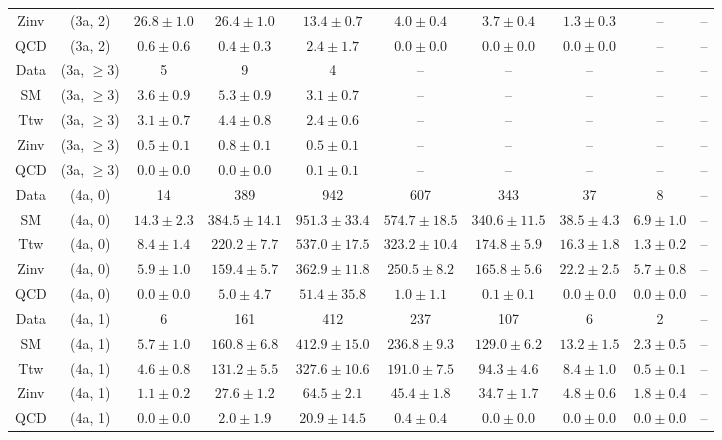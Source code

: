 \begin{table}[h!]
{\begin{tabular}{cccccccccc}
	Zinv & (3a, 2) & $26.8\pm 1.0$ & $26.4\pm 1.0$ & $13.4\pm 0.7$ & $4.0\pm 0.4$ & $3.7\pm 0.4$ & $1.3\pm 0.3$ & -- & -- \\[0.5ex] 
	QCD & (3a, 2) & $0.6\pm 0.6$ & $0.4\pm 0.3$ & $2.4\pm 1.7$ & $0.0\pm 0.0$ & $0.0\pm 0.0$ & $0.0\pm 0.0$ & -- & -- \\[0.5ex] 
	Data & (3a, $\ge3$) & 5 & 9 & 4 & -- & -- & -- & -- & -- \\[0.5ex] 
	SM & (3a, $\ge3$) & $3.6\pm 0.9$ & $5.3\pm 0.9$ & $3.1\pm 0.7$ & -- & -- & -- & -- & -- \\[0.5ex] 
	Ttw & (3a, $\ge3$) & $3.1\pm 0.7$ & $4.4\pm 0.8$ & $2.4\pm 0.6$ & -- & -- & -- & -- & -- \\[0.5ex] 
	Zinv & (3a, $\ge3$) & $0.5\pm 0.1$ & $0.8\pm 0.1$ & $0.5\pm 0.1$ & -- & -- & -- & -- & -- \\[0.5ex] 
	QCD & (3a, $\ge3$) & $0.0\pm 0.0$ & $0.0\pm 0.0$ & $0.1\pm 0.1$ & -- & -- & -- & -- & -- \\[0.5ex] 
	Data & (4a, 0) & 14 & 389 & 942 & 607 & 343 & 37 & 8 & -- \\[0.5ex] 
	SM & (4a, 0) & $14.3\pm 2.3$ & $384.5\pm 14.1$ & $951.3\pm 33.4$ & $574.7\pm 18.5$ & $340.6\pm 11.5$ & $38.5\pm 4.3$ & $6.9\pm 1.0$ & -- \\[0.5ex] 
	Ttw & (4a, 0) & $8.4\pm 1.4$ & $220.2\pm 7.7$ & $537.0\pm 17.5$ & $323.2\pm 10.4$ & $174.8\pm 5.9$ & $16.3\pm 1.8$ & $1.3\pm 0.2$ & -- \\[0.5ex] 
	Zinv & (4a, 0) & $5.9\pm 1.0$ & $159.4\pm 5.7$ & $362.9\pm 11.8$ & $250.5\pm 8.2$ & $165.8\pm 5.6$ & $22.2\pm 2.5$ & $5.7\pm 0.8$ & -- \\[0.5ex] 
	QCD & (4a, 0) & $0.0\pm 0.0$ & $5.0\pm 4.7$ & $51.4\pm 35.8$ & $1.0\pm 1.1$ & $0.1\pm 0.1$ & $0.0\pm 0.0$ & $0.0\pm 0.0$ & -- \\[0.5ex] 
	Data & (4a, 1) & 6 & 161 & 412 & 237 & 107 & 6 & 2 & -- \\[0.5ex] 
	SM & (4a, 1) & $5.7\pm 1.0$ & $160.8\pm 6.8$ & $412.9\pm 15.0$ & $236.8\pm 9.3$ & $129.0\pm 6.2$ & $13.2\pm 1.5$ & $2.3\pm 0.5$ & -- \\[0.5ex] 
	Ttw & (4a, 1) & $4.6\pm 0.8$ & $131.2\pm 5.5$ & $327.6\pm 10.6$ & $191.0\pm 7.5$ & $94.3\pm 4.6$ & $8.4\pm 1.0$ & $0.5\pm 0.1$ & -- \\[0.5ex] 
	Zinv & (4a, 1) & $1.1\pm 0.2$ & $27.6\pm 1.2$ & $64.5\pm 2.1$ & $45.4\pm 1.8$ & $34.7\pm 1.7$ & $4.8\pm 0.6$ & $1.8\pm 0.4$ & -- \\[0.5ex] 
	QCD & (4a, 1) & $0.0\pm 0.0$ & $2.0\pm 1.9$ & $20.9\pm 14.5$ & $0.4\pm 0.4$ & $0.0\pm 0.0$ & $0.0\pm 0.0$ & $0.0\pm 0.0$ & -- \\[0.5ex] 

\end{tabular}}
\end{table}
